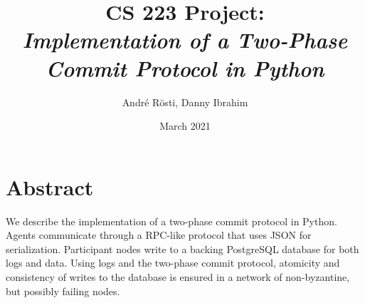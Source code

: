 \documentclass{article}
\title{CS 223 Project: \\
\textit{Implementation of a Two-Phase
Commit Protocol in Python}}
\author{André Rösti, Danny Ibrahim}
\date{March 2021}
\begin{document}
\maketitle

\vfill

{\centering
\section*{Abstract}

We describe the implementation of a two-phase commit protocol
in Python. Agents communicate through a RPC-like protocol
that uses JSON for serialization. Participant nodes write to
a backing PostgreSQL database for both logs and data. Using
logs and the two-phase commit protocol, atomicity and 
consistency of writes to the database is ensured in a
network of non-byzantine, but possibly failing nodes.
}

\vfill

\tableofcontents

\newpage
\end{document}
